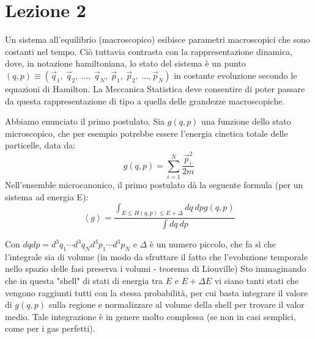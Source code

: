 \documentclass[../MeccanicaStatistica.tex]{subfiles}
\begin{document}
\section{Lezione 2}%
 Un sistema all'equilibrio (macroscopico) esibisce parametri macroscopici che sono costanti nel tempo. Ciò tuttavia contrasta con la rappresentazione dinamica, dove, in notazione hamiltoniana, lo stato del sistema è un punto $\left(q,p\right)\equiv\left({\vec{q}}_1,\ {\vec{q}}_2,\ \ldots,\ {\vec{q}}_N,\ {\vec{p}}_1,\ {\vec{p}}_2,\ \ldots,{\vec{p}}_N\right)$ in costante evoluzione secondo le equazioni di Hamilton. La Meccanica Statistica deve consentire di poter passare da questa rappresentazione di tipo a quella delle grandezze macroscopiche.

Abbiamo enunciato il primo postulato. 
Sia $g(q,p)$ una funzione dello stato microscopico, che per esempio potrebbe essere l'energia cinetica totale delle particelle, data da:
\[
g\left(q,p\right)= \sum_{i=1}^{N}\frac{{\vec{p}}_i^2}{2m}
\]
Nell'ensemble microcanonico, il primo postulato dà la seguente formula (per un sistema ad energia E):
\[
\left\langle g\right\rangle=\frac{\int_{E\le H\left(q,p\right)\le E+\Delta}{dq\ dpg\left(q,p\right)}}{\int{dq\ dp}}
\]

Con $dq dp=d^3q_1\cdots d^3q_N d^3p_1\cdots d^3p_N$ e $\Delta$ è un numero piccolo, che fa sì che l'integrale sia di volume (in modo da sfruttare il fatto che l'evoluzione temporale nello spazio delle fasi preserva i volumi - teorema di Liouville)
Sto immaginando che in questa "shell" di stati di energia tra $E$ e $E+\Delta E$ vi siano tanti stati che vengono raggiunti tutti con la stessa probabilità, per cui basta integrare il valore di $g(q,p)$ sulla regione e normalizzare al volume della shell per trovare il valor medio.
Tale integrazione è in genere molto complessa (se non in casi semplici, come per i gas perfetti). 
\end{document}
